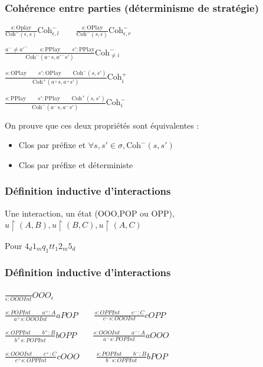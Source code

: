 \documentclass{beamer}
\begin{document}
\begin{frame}
\frametitle{Cohérence entre parties (déterminisme de stratégie)}

$\frac{s:\text{Oplay}}{\text{Coh}^-(\epsilon,s)} \text{Coh}^-_{\epsilon,l} \qquad
 \frac{s:\text{OPlay}}{\text{Coh}^-(s,\epsilon)} \text{Coh}^-_{\epsilon,r}$

$\frac{a^- \neq a'^- \qquad s:\text{PPlay} \qquad s':\text{PPlay}}
{\text{Coh}^-(a^-s, a'^- s')} \text{Coh}^-_{\neq i}$

$\frac{s : \text{OPlay} \qquad s':\text{OPlay} \qquad \text{Coh}^-(s,s')}
{\text{Coh}^+(a^+s, a^+s')} \text{Coh}^+_i$

$\frac{s : \text{PPlay} \qquad s':\text{PPlay} \qquad \text{Coh}^+(s,s')}
{\text{Coh}^-(a^-s, a^-s')} \text{Coh}^-_i$
\pause

On prouve que ces deux propriétés sont équivalentes :
\begin{itemize}
\item Clos par préfixe et $\forall s, s' \in \sigma, \text{Coh}^-(s, s')$
\item Clos par préfixe et déterministe
\end{itemize}

\end{frame}

\begin{frame}
\frametitle{Définition inductive d'interactions}

Une interaction, un état (OOO,POP ou OPP), $u\upharpoonright (A,B), u \upharpoonright (B,C), u \upharpoonright (A,C)$

Pour $4_d 1_m q_1 tt_1 2_m 5_d$

\end{frame}

\begin{frame}
\frametitle{Définition inductive d'interactions}



$\frac{}{\epsilon : OOOInt} OOO_{\epsilon}$

$\frac{s : POPInt \qquad a^+ : A}{a^+ s : OOOInt} aPOP \qquad
 \frac{s : OPPInt \qquad c^- : C}{c^- s : OOOInt} cOPP$

$\frac{s : OPPInt \qquad b^+ : B}{b^+ s : POPInt} bOPP \qquad
 \frac{s : OOOInt \qquad a^- : A}{a^- s : POPInt} aOOO$

$\frac{s : OOOInt \qquad c^+ : C}{c^+ s : OPPInt} cOOO \qquad
 \frac{s : POPInt \qquad b^- : B}{b^- s : OPPInt} bPOP$

\end{frame}
\end{document}
